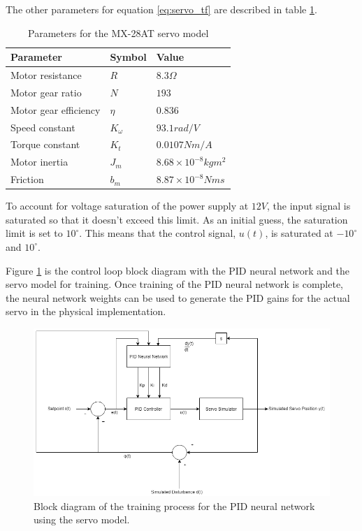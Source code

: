 \documentclass[letterpaper,12pt]{article}
\newcommand{\degrees}{^\circ}
\begin{document}
The other parameters for equation \ref{eq:servo_tf} are described in table \ref{tab:servo_params}.

\begin{table}[H]
	\begin{center}
		\caption{Parameters for the MX-28AT servo model \cite{m.r.o.a.maximo}}
        \label{tab:servo_params}
        \begin{tabular}{l|l|l}
        Parameter & Symbol & Value \\
        \hline
				Motor resistance & $R$ & $8.3 \Omega$ \\
				Motor gear ratio & $N$ & $193$ \\
				Motor gear efficiency & $\eta$ & $0.836$ \\
				Speed constant & $K_{\omega}$ & $93.1 rad/V$ \\
				Torque constant & $K_t$ & $0.0107 Nm/A$ \\
				Motor inertia & $J_m$ & $8.68 \times 10^{-8} kgm^2$ \\
				Friction & $b_m$ & $8.87 \times 10^{-8} Nms$ \\
        \end{tabular}
	\end{center}
\end{table}

To account for voltage saturation of the power supply at $12V$, the input signal is saturated so that it doesn't exceed this limit. As an initial guess, the saturation limit is set to $10\degrees$. This means that the control signal, $u(t)$, is saturated at $-10\degrees$ and $10\degrees$.

Figure \ref{fig:pid_model_levenberg} is the control loop block diagram with the PID neural network and the servo model for training. Once training of the PID neural network is complete, the neural network weights can be used to generate the PID gains for the actual servo in the physical implementation.


\begin{figure}[H]
\centering \includegraphics[width=0.8\columnwidth]{pid_model_levenberg.png}
\caption{\label{fig:pid_model_levenberg}Block diagram of the training process for the PID neural network using the servo model.}
\end{figure}
\end{document}

